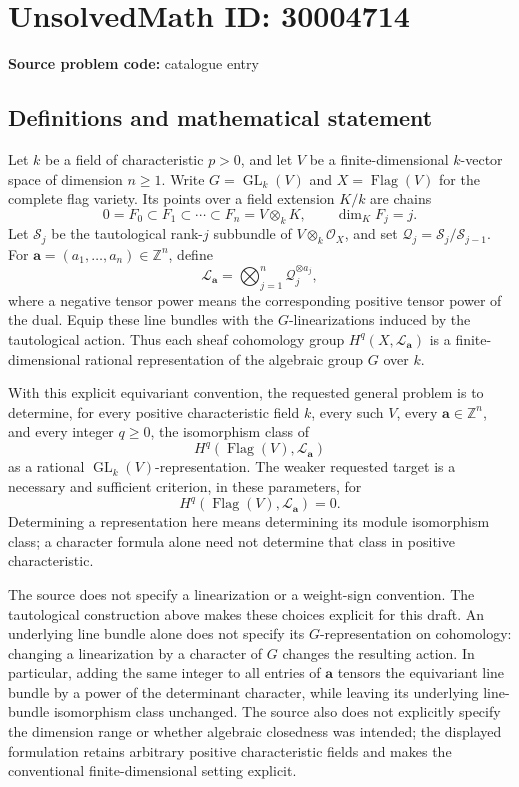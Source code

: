 \documentclass[11pt]{article}
\newcommand{\Z}{\mathbb{Z}}
\begin{document}
\section*{UnsolvedMath ID: 30004714}
\textbf{Source problem code:} catalogue entry
\subsection{Definitions and mathematical statement}
Let \(k\) be a field of characteristic \(p>0\), and let \(V\) be a finite-dimensional \(k\)-vector space of dimension \(n\geq 1\). Write \(G=\operatorname{GL}_k(V)\) and \(X=\operatorname{Flag}(V)\) for the complete flag variety. Its points over a field extension \(K/k\) are chains
\[
0=F_0\subset F_1\subset\cdots\subset F_n=V\otimes_k K,
\qquad \dim_K F_j=j.
\]
Let \(\mathcal S_j\) be the tautological rank-\(j\) subbundle of \(V\otimes_k\mathcal O_X\), and set \(\mathcal Q_j=\mathcal S_j/\mathcal S_{j-1}\). For \(\mathbf a=(a_1,\ldots,a_n)\in\Z^n\), define
\[
\mathcal L_{\mathbf a}=\bigotimes_{j=1}^{n}\mathcal Q_j^{\otimes a_j},
\]
where a negative tensor power means the corresponding positive tensor power of the dual. Equip these line bundles with the \(G\)-linearizations induced by the tautological action. Thus each sheaf cohomology group \(H^q(X,\mathcal L_{\mathbf a})\) is a finite-dimensional rational representation of the algebraic group \(G\) over \(k\).

With this explicit equivariant convention, the requested general problem is to determine, for every positive characteristic field \(k\), every such \(V\), every \(\mathbf a\in\Z^n\), and every integer \(q\geq0\), the isomorphism class of
\[
H^q\!\left(\operatorname{Flag}(V),\mathcal L_{\mathbf a}\right)
\]
as a rational \(\operatorname{GL}_k(V)\)-representation. The weaker requested target is a necessary and sufficient criterion, in these parameters, for
\[
H^q\!\left(\operatorname{Flag}(V),\mathcal L_{\mathbf a}\right)=0.
\]
Determining a representation here means determining its module isomorphism class; a character formula alone need not determine that class in positive characteristic.

The source does not specify a linearization or a weight-sign convention. The tautological construction above makes these choices explicit for this draft. An underlying line bundle alone does not specify its \(G\)-representation on cohomology: changing a linearization by a character of \(G\) changes the resulting action. In particular, adding the same integer to all entries of \(\mathbf a\) tensors the equivariant line bundle by a power of the determinant character, while leaving its underlying line-bundle isomorphism class unchanged. The source also does not explicitly specify the dimension range or whether algebraic closedness was intended; the displayed formulation retains arbitrary positive characteristic fields and makes the conventional finite-dimensional setting explicit.
\end{document}
